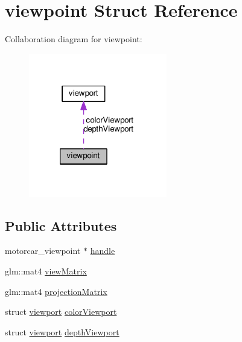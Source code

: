 \hypertarget{structviewpoint}{\section{viewpoint Struct Reference}
\label{structviewpoint}
}


Collaboration diagram for viewpoint\-:
\nopagebreak
\begin{figure}[H]
\begin{center}
\leavevmode
\includegraphics[width=171pt]{structviewpoint__coll__graph}
\end{center}
\end{figure}
\subsection*{Public Attributes}
\begin{DoxyCompactItemize}
\item 
motorcar\-\_\-viewpoint $\ast$ \hyperlink{structviewpoint_a8c1c1c5aa4dd94d65b501f05c792022c}{handle}
\item 
glm\-::mat4 \hyperlink{structviewpoint_a5cbad4a6aeb2c00e2c6df0091660568f}{view\-Matrix}
\item 
glm\-::mat4 \hyperlink{structviewpoint_a76ebff5efee2b82d9fac36aae8f5a055}{projection\-Matrix}
\item 
struct \hyperlink{structviewport}{viewport} \hyperlink{structviewpoint_a1643bba61a70d3ea15c2d59b6ec5302d}{color\-Viewport}
\item 
struct \hyperlink{structviewport}{viewport} \hyperlink{structviewpoint_a9122e1e61615264021eac6c311956458}{depth\-Viewport}
\end{DoxyCompactItemize}


